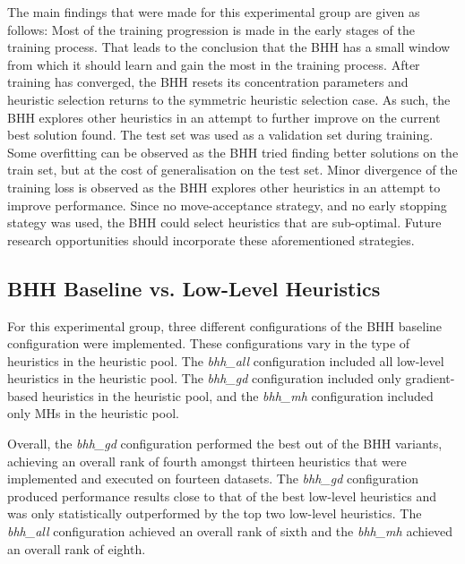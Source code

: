 The main findings that were made for this experimental group are given as follows: Most of the training progression is made in the early stages of the training process. That leads to the conclusion that the \acs{BHH} has a small window from which it should learn and gain the most in the training process. After training has converged, the \acs{BHH} resets its concentration parameters and heuristic selection returns to the symmetric heuristic selection case. As such, the \acs{BHH} explores other heuristics in an attempt to further improve on the current best solution found. The test set was used as a validation set during training. Some overfitting can be observed as the \acs{BHH} tried finding better solutions on the train set, but at the cost of generalisation on the test set. Minor divergence of the training loss is observed as the \acs{BHH} explores other heuristics in an attempt to improve performance. Since no move-acceptance strategy, and no early stopping stategy was used, the \acs{BHH} could select heuristics that are sub-optimal. Future research opportunities should incorporate these aforementioned strategies.


\subsection{\acs{BHH} Baseline vs. Low-Level Heuristics}
\label{sec:conclusion:results:summary:standalone}

For this experimental group, three different configurations of the \acs{BHH} baseline configuration were implemented. These configurations vary in the type of heuristics in the heuristic pool. The \textit{bhh\_all} configuration included all low-level heuristics in the heuristic pool. The \textit{bhh\_gd} configuration included only gradient-based heuristics in the heuristic pool, and the \textit{bhh\_mh} configuration included only \acp{MH} in the heuristic pool.

Overall, the \textit{bhh\_gd} configuration performed the best out of the \acs{BHH} variants, achieving an overall rank of fourth amongst thirteen heuristics that were implemented and executed on fourteen datasets. The \textit{bhh\_gd} configuration produced performance results close to that of the best low-level heuristics and was only statistically outperformed by the top two low-level heuristics. The \textit{bhh\_all} configuration achieved an overall rank of sixth and the \textit{bhh\_mh} achieved an overall rank of eighth.

